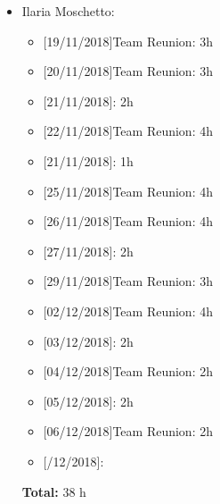 \begin{itemize}
\item Ilaria Moschetto: 
\begin{itemize}
    \item {[}19/11/2018{]}Team Reunion: 3h
    \item {[}20/11/2018{]}Team Reunion: 3h
    \item {[}21/11/2018{]}: 2h
    \item {[}22/11/2018{]}Team Reunion: 4h
    \item {[}21/11/2018{]}: 1h
    \item {[}25/11/2018{]}Team Reunion: 4h
    \item {[}26/11/2018{]}Team Reunion: 4h
    \item {[}27/11/2018{]}: 2h
    \item {[}29/11/2018{]}Team Reunion: 3h
    \item {[}02/12/2018{]}Team Reunion: 4h
    \item {[}03/12/2018{]}: 2h
    \item {[}04/12/2018{]}Team Reunion: 2h
    \item {[}05/12/2018{]}: 2h
    \item {[}06/12/2018{]}Team Reunion: 2h
    \item {[}/12/2018{]}:
\end{itemize}

\textbf{Total:} 38 h
\end{itemize}